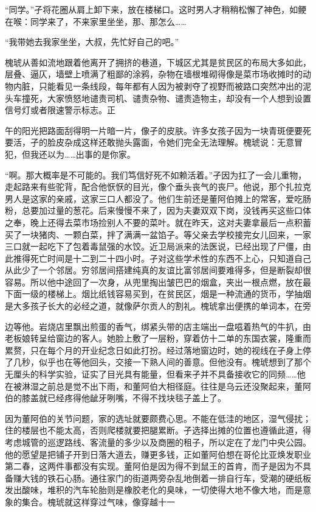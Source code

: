 \documentclass{article}
\begin{document}
“同学。”孑将花圈从肩上卸下来，放在楼梯口。这时男人才稍稍松懈了神色，如鲠在喉：同学来了，不来家里坐坐，那、那怎么……

“我带她去我家坐坐，大叔，先忙好自己的吧。”

槐琥从善如流地跟着他离开了拥挤的巷道，下城区尤其是贫民区的布局大多如此，层叠、逼仄，墙壁上喷满了粗鄙的涂鸦，杂物在墙根堆砌得像是菜市场收摊时的动物内脏，只能看见一条线段，每年都有人因为被剥夺了视野而被路口突然冲出的泥头车撞死，大家愤怒地谴责司机、谴责杂物、谴责造物主，却没有一个人想到设置信号灯或者限速警示标志。正

\newpage 

午的阳光把路面刮得明一片暗一片，像孑的皮肤。许多女孩子因为一块青斑便要死要活，孑的脸皮杂成这样还敢抛头露面，令她们完全无法理解。槐琥说：无意冒犯，但我还以为……出事的是你家。

“啊。那大概率是不可能的。我们笃信好死不如赖活着。”孑因为扛了一会儿重物，走起路来有些驼背，配合他恹恹的目光，像个垂头丧气的丧尸。他说，那个扎拉克男人是这家的亲戚，这家三口人都没了。他们生前还是董阿伯摊上的常客，爱吃肠粉，总要加过量的葱花。后来慢慢不来了，因为夫妻双双下岗，没钱再买这些口体之奉，晚上还得去菜市场捡别人不要的菜叶。就在昨天，这对夫妻拿最后一点积蓄买了一块猪肉、一颗白菜，拌了满满一盆馅子。等父亲去学校接完女儿回来，一家三口就一起吃下了包着毒鼠强的水饺。近卫局派来的法医说，已经出现了尸僵，由此推得死亡时间是十二到二十四小时。孑对这些学术性的东西不上心，只知道自己从此少了一个邻居。穷邻居间搭建纯真的友谊比富邻居间要难得多，但是断裂却很容易。所以他中途回了一次身，从兜里掏出皱巴巴的烟盒，夹出一根点燃，放在最下面一级的楼梯上。烟比纸钱容易买到，在贫民区，烟是一种流通的货币，学抽烟是大多孩子长大的必经之道，就像萨尔贡人的割礼。槐琥拿出便携的单词本，在旁

\newpage 

边等他。岩烧店里飘出煎蛋的香气，绑紧头带的店主端出一盘嗞着热气的牛扒，由老板娘转呈给窗边的客人。她脸上敷了一层粉，穿着仿十二单的东国衣裳，隆重而累赘，只在每个月的开业纪念日如此打扮。经过落地窗边时，她的视线在孑身上停了几秒，似乎也在等他回头，交接一下熟人间的善意。但他没有。槐琥想到了那个无厘头的科学实验，证实了目光具有能量，但看来孑并不具备接收它的同频……他在被淋湿之前总是觉不出下雨，和董阿伯大相径庭。往往是乌云还没聚起来，董阿伯的膝盖就已经疼得他龇牙咧嘴，不得不找块毯子盖上了。

因为董阿伯的关节问题，家的选址就要颇费心思。不能在低洼的地区，湿气侵扰；住的楼层也不能太高，否则爬楼就要把腿累断。孑选择出摊的位置也遵循此道，得考虑城管的巡逻路线、客流量的多少以及商圈的租子，所以定在了龙门中央公园。他的愿望是把铺子开到日落大道去，赚更多钱，正如董阿伯想在哥伦比亚焕发职业第二春，这两件事都没有实现。董阿伯是因为得不到鼠王的首肯，而孑是因为不具备赚大钱的铁石心肠。通往家门的街道两旁杂乱地倒着一排自行车，受潮的硬纸板发出酸味，堆积的汽车轮胎则是橡胶老化的臭味，一切使得大地不像大地，而是意象的集合。槐琥就这样穿过气味，像穿越十一
\end{document}
